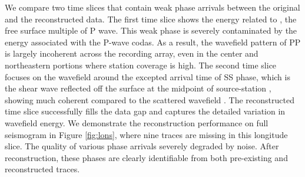 We compare two time slices that contain weak phase arrivals between the original and the reconstructed data.  The first time slice shows the energy related to  , the free surface multiple of P wave. This weak phase is severely contaminated by the  energy associated with the P-wave codas.  As a result, the wavefield pattern of PP is largely incoherent across the recording array, even in the center and northeastern portions where station coverage is high. The second time slice focuses on the wavefield around the excepted arrival time of SS phase, which is the shear wave reflected off the surface at the midpoint of source-station , showing much coherent  compared to the scattered wavefield . The reconstructed time slice successfully fills the data gap and captures the detailed variation in wavefield energy. We demonstrate the reconstruction performance on full seismogram in Figure \ref{fig:lons}, where nine traces are missing in this longitude slice. The quality of various phase arrivals  severely degraded by noise.  After reconstruction, these phases are clearly identifiable from both pre-existing and reconstructed traces.  

